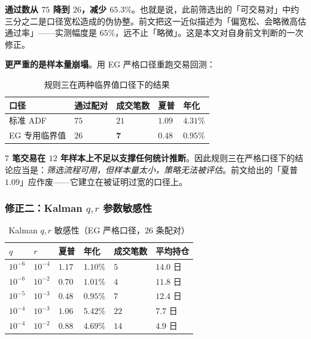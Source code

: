 \textbf{通过数从 $75$ 降到 $26$，减少 $65.3\%$}。也就是说，此前筛选出的「可交易对」中约三分之二是口径宽松造成的伪协整。前文把这一近似描述为「偏宽松、会略微高估通过率」——实测幅度是 $65\%$，远不止「略微」。这是本文对自身前文判断的一次修正。

\textbf{更严重的是样本量崩塌}。用 EG 严格口径重跑交易回测：

\begin{table}[htbp]
\centering\footnotesize
\caption{规则三在两种临界值口径下的结果}\label{tab:r3cmp}
\begin{tabular}{@{}>{\raggedright\arraybackslash}p{3.4cm}>{\raggedright\arraybackslash}p{2.2cm}>{\raggedright\arraybackslash}p{2.2cm}>{\raggedright\arraybackslash}p{2.2cm}>{\raggedright\arraybackslash}p{2.2cm}@{}}
\toprule
\textbf{口径} & \textbf{通过配对} & \textbf{成交笔数} & \textbf{夏普} & \textbf{年化} \\
\midrule
标准 ADF & $75$ & $21$ & $1.09$ & $4.31\%$ \\
EG 专用临界值 & $26$ & $\mathbf{7}$ & $0.48$ & $0.95\%$ \\
\bottomrule
\end{tabular}
\end{table}

\textbf{$7$ 笔交易在 $12$ 年样本上不足以支撑任何统计推断}。因此规则三在严格口径下的结论应当是：\emph{筛选流程可用，但样本量太小，策略无法被评估}。前文给出的「夏普 $1.09$」应作废——它建立在被证明过宽的口径上。

\subsubsection*{修正二：Kalman $q,r$ 参数敏感性}

\begin{table}[htbp]
\centering\footnotesize
\caption{Kalman $q,r$ 敏感性（EG 严格口径，$26$ 条配对）}\label{tab:kalsens}
\begin{tabular}{@{}>{\raggedright\arraybackslash}p{1.8cm}>{\raggedright\arraybackslash}p{1.6cm}>{\raggedright\arraybackslash}p{1.6cm}>{\raggedright\arraybackslash}p{1.7cm}>{\raggedright\arraybackslash}p{2.0cm}>{\raggedright\arraybackslash}p{1.8cm}@{}}
\toprule
\textbf{$q$} & \textbf{$r$} & \textbf{夏普} & \textbf{年化} & \textbf{成交笔数} & \textbf{平均持仓} \\
\midrule
$10^{-6}$ & $10^{-4}$ & $1.17$ & $1.10\%$ & $5$ & $14.0$ 日 \\
$10^{-6}$ & $10^{-2}$ & $0.70$ & $1.01\%$ & $4$ & $11.8$ 日 \\
$10^{-5}$ & $10^{-3}$ & $0.48$ & $0.95\%$ & $7$ & $12.4$ 日 \\
$10^{-4}$ & $10^{-3}$ & $1.06$ & $5.42\%$ & $22$ & $7.7$ 日 \\
$10^{-4}$ & $10^{-2}$ & $0.88$ & $4.69\%$ & $14$ & $4.9$ 日 \\
\bottomrule
\end{tabular}
\end{table}

